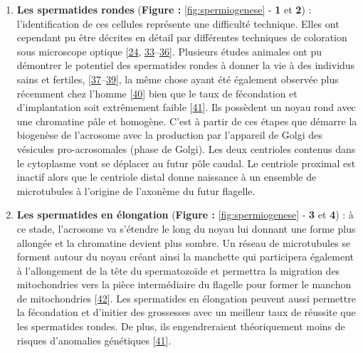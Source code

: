 \documentclass[12pt,a4paper,twoside]{ugathesis}
\theoremstyle{definition}
\theoremstyle{definition}
\theoremstyle{definition}
\theoremstyle{remark}
\begin{document}
\begin{enumerate}
\def\labelenumi{\arabic{enumi}.}
\item
  \textbf{Les spermatides rondes} (\textbf{Figure :
  }\ref{fig:spermiogenese} - \textbf{1} et \textbf{2}) :
  l'identification de ces cellules représente une difficulté technique.
  Elles ont cependant pu être décrites en détail par différentes
  techniques de coloration sous microscope optique
  {[}\protect\hyperlink{ref-Clermont1963}{24},
  \protect\hyperlink{ref-Papic}{33}--\protect\hyperlink{ref-WorldHealthOrganization1992}{36}{]}.
  Plusieurs études animales ont pu démontrer le potentiel des
  spermatides rondes à donner la vie à des individus sains et fertiles,
  {[}\protect\hyperlink{ref-Ogura1994}{37}--\protect\hyperlink{ref-Sasagawa}{39}{]},
  la même chose ayant été également observée plus récemment chez l'homme
  {[}\protect\hyperlink{ref-Tanaka2015}{40}{]} bien que le taux de
  fécondation et d'implantation soit extrêmement faible
  {[}\protect\hyperlink{ref-Asimakopoulos2003}{41}{]}. Ils possèdent un
  noyau rond avec une chromatine pâle et homogène. C'est à partir de ces
  étapes que démarre la biogenèse de l'acrosome avec la production par
  l'appareil de Golgi des vésicules pro-acrosomales (phase de Golgi).
  Les deux centrioles contenus dans le cytoplasme vont se déplacer au
  futur pôle caudal. Le centriole proximal est inactif alors que le
  centriole distal donne naissance à un ensemble de microtubules à
  l'origine de l'axonème du futur flagelle.
\item
  \textbf{Les spermatides en élongation} (\textbf{Figure :
  }\ref{fig:spermiogenese} - \textbf{3} et \textbf{4}) : à ce stade,
  l'acrosome va s'étendre le long du noyau lui donnant une forme plus
  allongée et la chromatine devient plus sombre. Un réseau de
  microtubules se forment autour du noyau créant ainsi la manchette qui
  participera également à l'allongement de la tête du spermatozoïde et
  permettra la migration des mitochondries vers la pièce intermédiaire
  du flagelle pour former le manchon de mitochondries
  {[}\protect\hyperlink{ref-Moreno2006}{42}{]}. Les spermatides en
  élongation peuvent aussi permettre la fécondation et d'initier des
  grossesses avec un meilleur taux de réussite que les spermatides
  rondes. De plus, ils engendreraient théoriquement moins de risques
  d'anomalies génétiques
  {[}\protect\hyperlink{ref-Asimakopoulos2003}{41}{]}.
\end{enumerate}

\newpage
\end{document}
